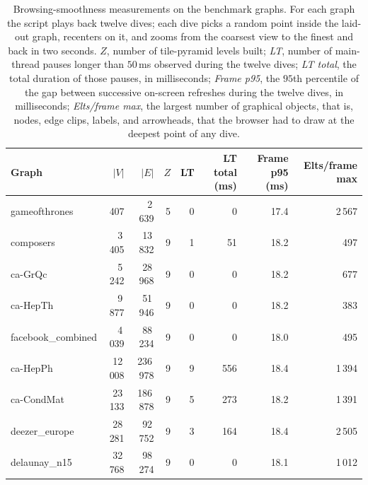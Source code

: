 \begin{table}[t]
  \centering
  \scriptsize
  \setlength{\tabcolsep}{4pt}
  \begin{tabular}{@{}lrrrrrrr@{}}
    \toprule
    Graph & $|V|$ & $|E|$ & $Z$ & LT & LT total (ms) & Frame p95 (ms) & Elts/frame max \\
    \midrule
    gameofthrones      &     407 &   2\,639 & 5 &  0 &     0 &  17.4 &   2\,567 \\
    composers          &  3\,405 &  13\,832 & 9 &  1 &    51 &  18.2 &      497 \\
    ca-GrQc            &  5\,242 &  28\,968 & 9 &  0 &     0 &  18.2 &      677 \\
    ca-HepTh           &  9\,877 &  51\,946 & 9 &  0 &     0 &  18.2 &      383 \\
    facebook\_combined &  4\,039 &  88\,234 & 9 &  0 &     0 &  18.0 &      495 \\
    ca-HepPh           & 12\,008 & 236\,978 & 9 &  9 &   556 &  18.4 &   1\,394 \\
    ca-CondMat         & 23\,133 & 186\,878 & 9 &  5 &   273 &  18.2 &   1\,391 \\
    deezer\_europe     & 28\,281 &  92\,752 & 9 &  3 &   164 &  18.4 &   2\,505 \\
    delaunay\_n15      & 32\,768 &  98\,274 & 9 &  0 &     0 &  18.1 &   1\,012 \\
    \bottomrule
  \end{tabular}
  \caption{Browsing-smoothness measurements on the benchmark graphs.
    For each graph the script plays back twelve dives; each dive picks
    a random point inside the laid-out graph, recenters on it, and
    zooms from the coarsest view to the finest and back in two
    seconds. \emph{$Z$}, number of tile-pyramid levels built;
    \emph{LT}, number of main-thread pauses longer than $50$\,ms
    observed during the twelve dives; \emph{LT total}, the total
    duration of those pauses, in milliseconds; \emph{Frame p95}, the
    $95$th percentile of the gap between successive on-screen
    refreshes during the twelve dives, in milliseconds;
    \emph{Elts/frame max}, the largest number of graphical objects,
    that is, nodes, edge clips, labels, and arrowheads, that the
    browser had to draw at the deepest point of any dive.}
  \label{tab:smoothness}
\end{table}

